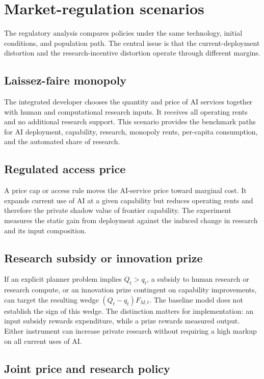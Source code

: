 \section{Market-regulation scenarios}
\label{sec:regulation}

The regulatory analysis compares policies under the same technology, initial
conditions, and population path. The central issue is that the current-deployment
distortion and the research-incentive distortion operate through different margins.

\subsection{Laissez-faire monopoly}

The integrated developer chooses the quantity and price of AI services together with
human and computational research inputs. It receives all operating rents and no
additional research support. This scenario provides the benchmark paths for AI
deployment, capability, research, monopoly rents, per-capita consumption, and the
automated share of research.

\subsection{Regulated access price}

A price cap or access rule moves the AI-service price toward marginal cost. It expands
current use of AI at a given capability but reduces operating rents and therefore the
private shadow value of frontier capability. The experiment measures the static gain
from deployment against the induced change in research and its input composition.

\subsection{Research subsidy or innovation prize}

If an explicit planner problem implies $Q_t>q_t$, a subsidy to human research or
research compute, or an innovation prize contingent on capability improvements, can
target the resulting wedge $(Q_t-q_t)F_{M,t}$. The baseline model does not establish
the sign of this wedge. The distinction matters for implementation: an input subsidy
rewards expenditure, while a prize rewards measured output. Either instrument can
increase private research without requiring a high markup on all current uses of AI.

\subsection{Joint price and research policy}

